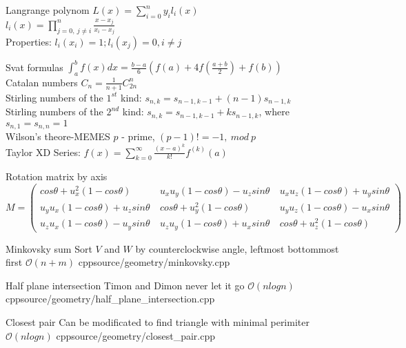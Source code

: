 \documentclass[landscape, 10pt, a4paper, oneside, twocolumn]{extarticle}
\begin{document}
\Formula
{Langrange polynom}
{
    $L(x) = \sum_{i=0}^{n} y_{i} l_{i} (x)$ \\
    $l_{i} (x) = \prod_{j=0,\ j \neq i}^{n} \frac{x - x_{j}}{x_{i} - x_{j}}$ \\
    Properties: $l_{i} (x_{i}) = 1; l_{i} (x_{j}) = 0, i \neq j$
}

\Formula
{Svat formulas}
{
    $\int_{a}^{b} f(x) dx = \frac{b - a}{6} (f(a) + 4 f(\frac{a + b}{2}) + f(b)) $ \\
    Catalan numbers $C_{n} = \frac{1}{n+1} C_{2n}^{n} $ \\
    Stirling numbers of the $1^{st}$ kind: $s_{n, k} = s_{n - 1, k - 1} + (n - 1) s_{n - 1, k}$ \\
    Stirling numbers of the $2^{nd}$ kind: $s_{n, k} = s_{n - 1, k - 1} + k s_{n - 1, k}$, where $s_{n, 1} = s_{n, n} = 1$ \\
    Wilson's theore-MEMES $p$ - prime, $(p - 1)! = - 1,\ mod\ p$ \\
    Taylor XD Series: $f(x) = \sum_{k=0}^{\infty} \frac{(x - a)^{k}}{k!} f^{(k)}(a)$ 
}

\Formula
{Rotation matrix by axis}
{ $ M = 
	\left ( 
		\begin{smallmatrix} 
			cos\theta + u_{x}^{2} (1 - cos\theta) \  & u_{x} u_{y} (1 - cos\theta) - u_{z} sin\theta \ & u_{x} u_{z} (1 - cos\theta) + u_{y} sin\theta \\ 
			u_{y} u_{x} (1 - cos\theta) + u_{z} sin\theta \ & cos\theta + u_{y}^{2} (1 - cos\theta) \ & u_{y} u_{z} (1 - cos\theta) - u_{x} sin\theta \\ 
			u_{z} u_{x} (1 - cos\theta) - u_{y} sin\theta \ & u_{z} u_{y} (1 - cos\theta) + u_{x} sin\theta \ & cos\theta + u_{z}^{2} (1 - cos\theta)
		\end{smallmatrix} 
	\right ) $
}

\Algorithm
{Minkovsky sum}
{Sort $V$ and $W$ by counterclockwise angle, leftmost bottommost first}
{$\mathcal{O}(n + m)$}
{cpp}{source/geometry/minkovsky.cpp}

\Algorithm
{Half plane intersection}
{Timon and Dimon never let it go}
{$\mathcal{O}(n logn)$}
{cpp}{source/geometry/half_plane_intersection.cpp}

\Algorithm
{Closest pair}
{Can be modificated to find triangle with minimal perimiter}
{$\mathcal{O}(n logn)$}
{cpp}{source/geometry/closest_pair.cpp}
\end{document}
